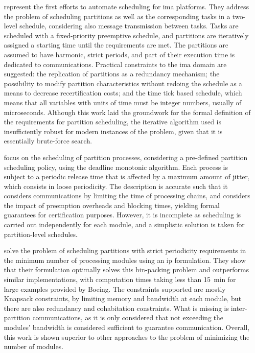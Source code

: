 \documentclass[main.tex]{subfiles}
\begin{document}
\Textcite{lee2000scheduling} represent the first efforts to automate scheduling for \gls{ima} platforms.
They address the problem of scheduling partitions as well as the corresponding tasks in a two-level schedule, considering also message transmission between tasks.
Tasks are scheduled with a fixed-priority preemptive schedule, and partitions are iteratively assigned a starting time until the requirements are met.
The partitions are assumed to have harmonic, strict periods, and part of their execution time is dedicated to communications. 
Practical constraints to the \gls{ima} domain are suggested: the replication of partitions as a redundancy mechanism; the possibility to modify partition characteristics without redoing the schedule as a means to decrease recertification costs; and the time tick based schedule, which means that all variables with units of time must be integer numbers, usually of microseconds.
Although this work laid the groundwork for the formal definition of the requirements for partition scheduling, the iterative algorithm used is insufficiently robust for modern instances of the problem, given that it is essentially brute-force search.

\Textcite{easwaran2009compositional} focus on the scheduling of partition processes, considering a pre-defined partition scheduling policy, using the deadline monotonic algorithm.
Each process is subject to a periodic release time that is affected by a maximum amount of jitter, which consists in loose periodicity.
The description is accurate such that it considers communications by limiting the time of processing chains, and considers the impact of preemption overheads and blocking times, yielding formal guarantees for certification purposes.
However, it is incomplete as scheduling is carried out independently for each module, and a simplistic solution is taken for partition-level schedules.

\Textcite{eisenbrand2010solving} solve the problem of scheduling partitions with strict periodicity requirements in the minimum number of processing modules using an \gls{ip} formulation.
They show that their formulation optimally solves this bin-packing problem and outperforms similar implementations, with computation times taking less than \SI{15}{\minute} for large examples provided by Boeing.
The constraints supported are mostly Knapsack constraints, by limiting memory and bandwidth at each module, but there are also redundancy and cohabitation constraints. 
What is missing is inter-partition communications, as it is only considered that not exceeding the modules' bandwidth is considered sufficient to guarantee communication.
Overall, this work is shown superior to other approaches to the problem of minimizing the number of modules.
\end{document}
